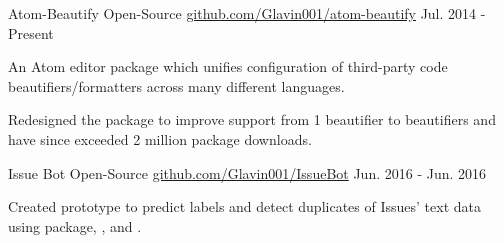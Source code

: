 

\begin{cventries}

  \cventry
    {Atom-Beautify} %
    {Open-Source} %
    {\href{https://github.com/Glavin001/atom-beautify}{github.com/Glavin001/atom-beautify}} %
    {Jul. 2014 - Present} %
    {
      \begin{cvitems} %
        \item {An Atom editor package which unifies configuration of  third-party code beautifiers/formatters across many different languages.}
        \item {Redesigned the package to improve support from 1 beautifier to  beautifiers and have since exceeded 2 million package downloads.}
      \end{cvitems}
    }

  \cventry
    {Issue Bot} %
    {Open-Source} %
    {\href{https://github.com/Glavin001/IssueBot}{github.com/Glavin001/IssueBot}} %
    {Jun. 2016 - Jun. 2016} %
    {
      \begin{cvitems} %
        \item {Created prototype to predict labels and detect duplicates of  Issues' text data using  package, , and .}
      \end{cvitems}
    }

\end{cventries}
